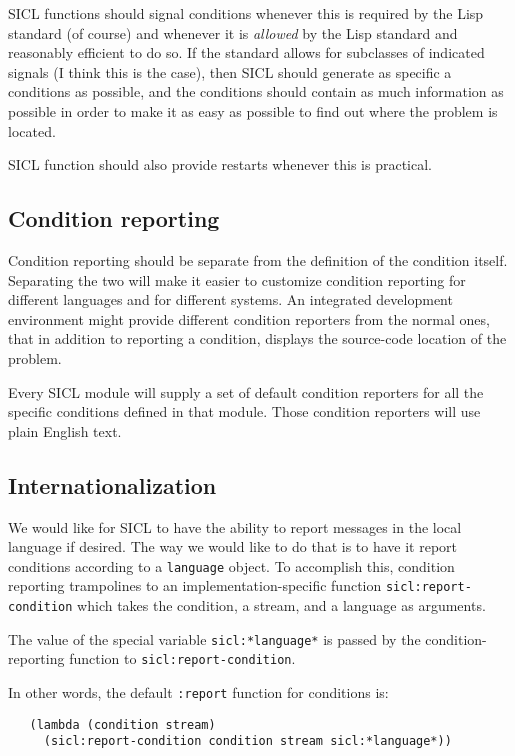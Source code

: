 \documentclass{article}
\def\sysname{SICL}
\begin{document}
\sysname{} functions should signal conditions whenever this is
required by the Lisp standard (of course) and whenever it is
\emph{allowed} by the Lisp standard and reasonably efficient to do so.
If the standard allows for subclasses of indicated signals (I think
this is the case), then \sysname{} should generate as specific a
conditions as possible, and the conditions should contain as much
information as possible in order to make it as easy as possible to
find out where the problem is located.

\sysname{} function should also provide restarts whenever this is
practical. 

\subsection{Condition reporting}

Condition reporting should be separate from the definition of the
condition itself.  Separating the two will make it easier to customize
condition reporting for different languages and for different
systems.  An integrated development environment might provide
different condition reporters from the normal ones, that in addition
to reporting a condition, displays the source-code location of the
problem. 

Every \sysname{} module will supply a set of default condition
reporters for all the specific conditions defined in that module.
Those condition reporters will use plain English text. 

\subsection{Internationalization}

We would like for {\sysname} to have the ability to report messages in
the local language if desired.  The way we would like to do that is to
have it report conditions according to a \texttt{language} object.  To
accomplish this, condition reporting trampolines to an
implementation-specific function \texttt{sicl:report-condition} which
takes the condition, a stream, and a language as arguments.

The value of the special variable \texttt{sicl:*language*} is passed
by the condition-reporting function to \texttt{sicl:report-condition}.

In other words, the default \texttt{:report} function for conditions is:

\begin{verbatim}
   (lambda (condition stream) 
     (sicl:report-condition condition stream sicl:*language*))
\end{verbatim}
\end{document}
